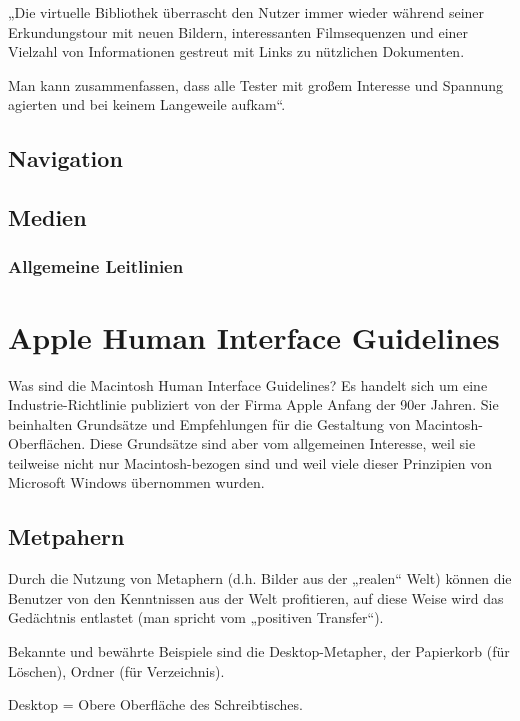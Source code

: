 „Die virtuelle Bibliothek überrascht den Nutzer immer wieder während seiner Erkundungstour mit neuen Bildern, interessanten Filmsequenzen und einer Vielzahl von Informationen gestreut mit Links zu nützlichen Dokumenten. 

Man kann zusammenfassen, dass alle Tester mit großem Interesse und Spannung agierten und bei keinem Langeweile aufkam“.

\subsection{Navigation}

\subsection{Medien}
\subsubsection*{Allgemeine Leitlinien}

\section{Apple Human Interface Guidelines}
Was sind die Macintosh Human Interface Guidelines?
Es handelt sich um eine Industrie-Richtlinie publiziert von der Firma Apple Anfang der 90er Jahren. Sie beinhalten Grundsätze und Empfehlungen für die Gestaltung von Macintosh-Oberflächen. Diese Grundsätze sind aber vom allgemeinen Interesse, weil sie teilweise nicht nur Macintosh-bezogen sind und weil viele dieser Prinzipien von Microsoft Windows übernommen wurden.

\subsection{Metpahern}
Durch die Nutzung von Metaphern (d.h. Bilder aus der „realen“ Welt)  können die Benutzer von den Kenntnissen aus der Welt profitieren, auf diese Weise wird das Gedächtnis entlastet  (man spricht vom „positiven Transfer“).

Bekannte und bewährte Beispiele sind die Desktop-Metapher, der Papierkorb (für Löschen), Ordner (für Verzeichnis).

Desktop = Obere Oberfläche des Schreibtisches. 

